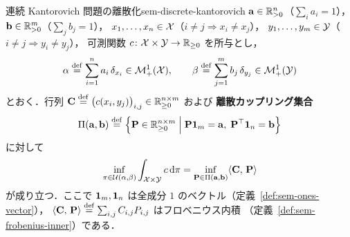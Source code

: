\begin{proposition}{連続 Kantorovich 問題の離散化}{sem-discrete-kantorovich}
  $\mathbf{a} \in \mathbb{R}_{>0}^n$（$\sum_i a_i = 1$），$\mathbf{b} \in \mathbb{R}_{>0}^m$（$\sum_j b_j = 1$），
  $x_1, \ldots, x_n \in \mathcal{X}$（$i \neq j \Rightarrow x_i \neq x_j$），
  $y_1, \ldots, y_m \in \mathcal{Y}$（$i \neq j \Rightarrow y_i \neq y_j$），
  可測関数 $c \colon \mathcal{X} \times \mathcal{Y} \to \mathbb{R}_{\geq 0}$ を所与とし，
  \[
    \alpha \overset{\mathrm{def}}{=} \sum_{i=1}^n a_i\, \delta_{x_i} \in \mathcal{M}_+^1(\mathcal{X}), \qquad
    \beta  \overset{\mathrm{def}}{=} \sum_{j=1}^m b_j\, \delta_{y_j} \in \mathcal{M}_+^1(\mathcal{Y})
  \]
  とおく．行列 $\mathbf{C} \overset{\mathrm{def}}{=} \bigl(c(x_i, y_j)\bigr)_{i,j} \in \mathbb{R}_{\geq 0}^{n \times m}$ および
  \textbf{離散カップリング集合}
  \[
    \Pi(\mathbf{a}, \mathbf{b}) \overset{\mathrm{def}}{=}
    \left\{ \mathbf{P} \in \mathbb{R}_{\geq 0}^{n \times m} \;\middle|\;
      \mathbf{P}\mathbf{1}_m = \mathbf{a},\;
      \mathbf{P}^\top\mathbf{1}_n = \mathbf{b}
    \right\}
  \]
  に対して
  \[
    \inf_{\pi \in \mathcal{U}(\alpha,\beta)}
      \int_{\mathcal{X}\times\mathcal{Y}} c\,\mathrm{d}\pi
    = \inf_{\mathbf{P} \in \Pi(\mathbf{a}, \mathbf{b})}
      \langle \mathbf{C},\, \mathbf{P} \rangle
  \]
  が成り立つ．ここで $\mathbf{1}_m, \mathbf{1}_n$ は全成分 $1$ のベクトル（定義~\ref{def:sem-ones-vector}），
  $\langle \mathbf{C},\, \mathbf{P} \rangle \overset{\mathrm{def}}{=} \sum_{i,j} C_{i,j} P_{i,j}$ はフロベニウス内積
  （定義~\ref{def:sem-frobenius-inner}）である．
\end{proposition}
